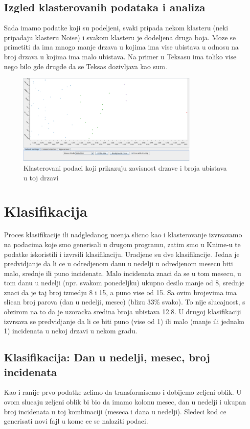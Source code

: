\documentclass[11pt]{article} %
\begin{document}
	
	\newpage
	\subsection{Izgled klasterovanih podataka i analiza}
	Sada imamo podatke koji su podeljeni, svaki pripada nekom klasteru (neki pripadaju klasteru Noise) i svakom klasteru je dodeljena druga boja. Moze se 
	primetiti da ima mnogo manje drzava u kojima ima vise ubistava u odnosu na broj drzava u kojima ima malo ubistava. Na primer u Teksasu ima toliko vise nego bilo gde drugde da se 
	Teksas dozivljava kao sum.
	
	\begin{figure}[h!]
	\centering
		\includegraphics[width=0.8\textwidth]{klasterovanje1}
		\caption{Klasterovani podaci koji prikazuju zavisnost drzave i broja ubistava u toj drzavi}
	\end{figure}
	
	\newpage
	\section{Klasifikacija}
	Proces klasifikacije ili nadgledanog ucenja slicno kao i klasterovanje izvrsavamo na podacima koje smo generisali u drugom programu, zatim smo u 
	Knime-u te podatke iskoristili i izvrsili klasifikaciju. 
	Uradjene su dve klasifikacije. 
	Jedna je predvidjanje da li ce u odredjenom danu u nedelji u odredjenom mesecu biti malo, srednje ili puno incidenata. 
	Malo incidenata znaci da se u tom mesecu, u tom danu u nedelji (npr. svakom ponedeljku) ukupno desilo manje od 8, srednje znaci da je taj broj izmedju 8 i 15, 
	a puno vise od 15. Sa ovim brojevima ima slican broj parova (dan u nedelji, mesec) (blizu 33\% svako). To nije slucajnost, s obzirom na to da je 
	uzoracka sredina broja ubistava 12.8.
	U drugoj klasifikaciji izvrsava se predvidjanje da li ce biti puno (vise od 1) ili malo (manje ili jednako 1) incidenata u nekoj drzavi u nekom gradu.
	
	\subsection{Klasifikacija: Dan u nedelji, mesec, broj incidenata}
	Kao i ranije prvo podatke zelimo da transformisemo i dobijemo zeljeni oblik. U ovom slucaju zeljeni oblik bi bio da imamo kolonu mesec, dan u nedelji i 
	ukupan broj incidenata u toj kombinaciji (meseca i dana u nedelji). Sledeci kod ce generisati novi fajl u kome ce se nalaziti podaci.
\end{document}
